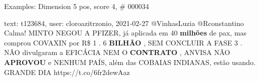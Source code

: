 \begin{frame}{Examples: Dimension 5 pos, score 4, \# 000034}
\footnotesize
\begin{exampleblock}{text: t123684, user: cloroazitrzonio, 2021-02-27}
@VinhasLuzia @Rconstantino Calma! MINTO NEGOU A PFIZER, já aplicada em 40 
\textbf{milhões} de pax, mas comprou COVAXIN por R\$ 1 . 6 \textbf{BILHÃO} , 
SEM CONCLUIR A FASE 3 . NÃO divulgaram a EFICÁCIA NEM O \textbf{CONTRATO} , 
ANVISA NÃO \textbf{APROVOU} e NENHUM PAÍS, além das COBAIAS INDIANAS, estão 
usando. GRANDE DIA  
https://t.co/6fr2dewAaz 
\end{exampleblock}
\end{frame}
